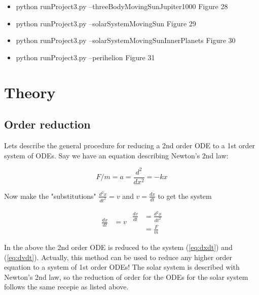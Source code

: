 \documentclass{article}
\begin{document}
\begin{itemize}
	\item  \colorbox{gray!30}{python runProject3.py --threeBodyMovingSunJupiter1000} Figure 28\\
	
	\item  \colorbox{gray!30}{python runProject3.py --solarSystemMovingSun} Figure 29\\
	
	\item  \colorbox{gray!30}{python runProject3.py --solarSystemMovingSunInnerPlanets} Figure 30\\
	
	\item  \colorbox{gray!30}{python runProject3.py --perihelion} Figure 31
\end{itemize}


\section{Theory}

\subsection{Order reduction}
Lets describe the general procedure for reducing a 2nd order ODE to a 1st order system of ODEs. Say we have an equation describing Newton's 2nd law:

\begin{equation}
F/m = a = \frac{d^2}{dx^2} = -kx
\end{equation}

Now make the "substitutions" $\frac{d^2x}{dt^2} = v$ and $v = \frac{dx}{dt}$ to get the system

\begin{subequations}
	\begin{align}\label{eq:dxdt}
	\frac{dx}{dt} &= v
	\end{align}
	
	\begin{align}
	\frac{dv}{dt} &= \frac{d^2x}{dt^2}\\
	 &= \frac{F}{m}\label{eq:dvdt}
	\end{align}
\end{subequations}

In the above the 2nd order ODE is reduced to the system (\ref{eq:dxdt}) and (\ref{eq:dvdt}). Actually, this method can be used to reduce any higher order equation to a system of 1st order ODEs! The solar system is described with Newton's 2nd law, so the reduction of order for the ODEs for the solar system follows the same recepie as listed above.\\
\end{document}
